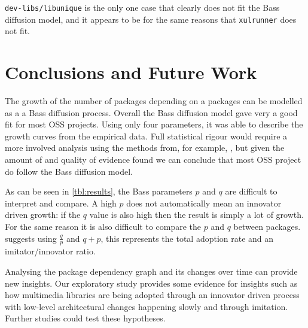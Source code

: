 \documentclass[smallextended,final]{svjour3}
\begin{document}
\texttt{dev-libs/libunique} is the only one case that clearly does not fit the Bass diffusion model, and it appears to be for the same reasons that \texttt{xulrunner} does not fit.




\section{Conclusions and Future Work}

The growth of the number of packages depending on a packages can be modelled as a a Bass diffusion process. Overall the Bass diffusion model gave very a good fit for most OSS projects. Using only four parameters, it was able to describe the growth curves from the empirical data. Full statistical rigour would require a more involved analysis using the methods from, for example, \citet{carlos06}, but given the amount of and quality of evidence found we can conclude that most OSS project do follow the Bass diffusion model.

As can be seen in \ref{tbl:results}, the Bass parameters $p$ and $q$ are difficult to interpret and compare. A high $p$ does not automatically mean an innovator driven growth: if the $q$ value is also high then the result is simply a lot of growth. For the same reason it is also difficult to compare the $p$ and $q$ between packages. \citet{mahajan95} suggests using $\frac{q}{p}$ and $q + p$, this represents the total adoption rate and an imitator/innovator ratio.

Analysing the package dependency graph and its changes over time can provide new insights. Our exploratory study provides some evidence for insights such as how multimedia libraries are being adopted through an innovator driven process with low-level architectural changes happening slowly and through imitation. Further studies could test these hypotheses.
\end{document}
